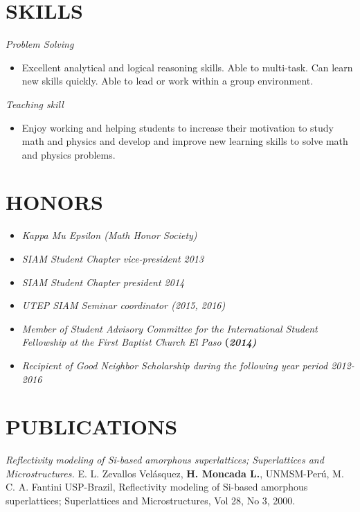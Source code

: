 \documentclass[margin]{res}
\begin{document}
\begin{resume}
\section{SKILLS}  
{\sl Problem Solving} \hfill \\ 
   \begin{itemize}\itemsep -2pt
      \item Excellent analytical and logical reasoning skills.  Able to multi-task. Can learn new skills quickly. Able to lead or
            work within a group environment.
  \end{itemize} 

{\sl Teaching skill} \hfill \\      
    \begin{itemize}\itemsep -2pt
      \item Enjoy working and helping students to increase their motivation to study math and physics 
            and develop and improve new learning skills to solve math and physics problems.
    \end{itemize} 

\section{HONORS} 
\begin{itemize}
 \item {\sl Kappa Mu Epsilon (\it {Math Honor Society})} %
 \item {\sl SIAM Student Chapter vice-president 2013}
 \item {\sl SIAM Student Chapter president 2014} %
 \item {\sl UTEP SIAM Seminar coordinator (\it {2015, 2016})}%
 \item {\sl Member of Student Advisory Committee for the International Student Fellowship at the First Baptist Church El Paso} \bf (\it {2014})%
 \item {\sl Recipient of Good Neighbor Scholarship during the following year period 2012-2016}   %
\end{itemize}

\section{PUBLICATIONS}
{\sl Reflectivity modeling of Si-based amorphous superlattices; Superlattices and Microstructures.}
E. L. Zevallos Velásquez,\textbf{ H. Moncada L.}, UNMSM-Perú, M. C. A. Fantini USP-Brazil, Reflectivity modeling of Si-based amorphous superlattices;
Superlattices and Microstructures, Vol 28, No 3, 2000.


\end{resume}
\end{document}
